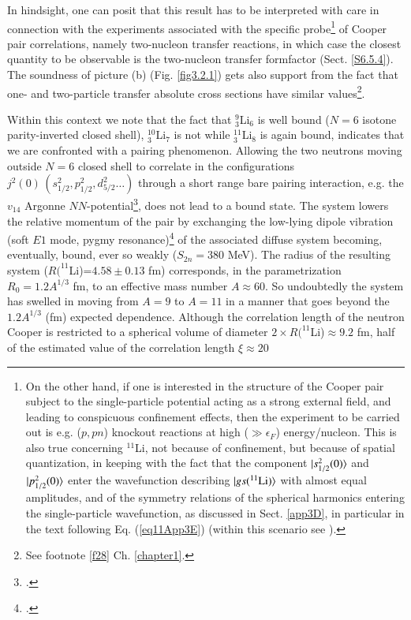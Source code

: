 In hindsight, one can posit that this result has to be interpreted with care in connection   with the experiments associated with the specific probe\footnote{On the other hand, if one is interested in the structure of the Cooper pair subject to the single-particle potential acting as a strong external field, and leading to conspicuous confinement effects, then the experiment to be carried out is e.g. ($p,pn$) knockout reactions at high ($\gg\epsilon_F$) energy/nucleon. This is also true concerning $^{11}$Li, not because of confinement, but because of spatial quantization, in keeping with the fact that the component $|{s_{1/2}^2(0)} \rangle$ and $|{p_{1/2}^2(0)} \rangle$ enter the wavefunction describing  $|{gs(^{11}\text{Li})} \rangle$ with almost equal amplitudes, and of the symmetry relations of the spherical harmonics entering the single-particle wavefunction, as discussed in Sect. \ref{app3D}, in particular in the text following Eq. (\ref{eq11App3E}) (within this scenario see \cite{Kubota:20}). } of Cooper pair correlations, namely two-nucleon transfer reactions, in which case the closest quantity to be observable is the two-nucleon transfer formfactor (Sect. \ref{S6.5.4}).
 The soundness of picture (b) (Fig. \ref{fig3.2.1}) gets also support from  the fact that one- and two-particle transfer  absolute cross sections have similar values\footnote{\label{f24} See footnote \ref{f28} Ch. \ref{chapter1}.}. 


 Within this context we note that the fact that $^9_3$Li$_6$ is well bound ($N=6$ isotone parity-inverted closed shell), $^{10}_3$Li$_7$ is not while $^{11}_3$Li$_8$ is again bound, indicates that we are confronted with a pairing phenomenon. Allowing the two neutrons moving outside $N=6$ closed shell to correlate in the configurations $j^2(0)\, (s_{1/2}^2, p_{1/2}^2, d_{5/2}^2\dots)$ through a short range bare pairing interaction, e.g. the $v_{14}$ Argonne $NN$-potential\footnote{\cite{Wiringa:84}.}, does not lead to a bound state. The system lowers the relative momentum of the pair by exchanging  the low-lying dipole vibration (soft $E1$ mode, pygmy resonance)\footnote{\cite{Broglia:19}.} of the associated diffuse system becoming, eventually, bound, ever so weakly ($S_{2n}=380$ MeV). The radius of the resulting system ($R(^{11}$Li)=$4.58\pm 0.13$ fm) corresponds, in the parametrization $R_0=1.2 A^{1/3}$ fm, to an effective mass number $A\approx 60$. So undoubtedly the system has swelled in moving from $A=9$ to $A=11$ in a manner that goes beyond the $1.2A^{1/3}$ (fm) expected dependence. Although the correlation length of the neutron Cooper is restricted to a spherical volume of diameter $2\times R(^{11}$Li)$\approx 9.2$ fm, half of the estimated value of the correlation length 
  $\xi\approx 20$ 
 
